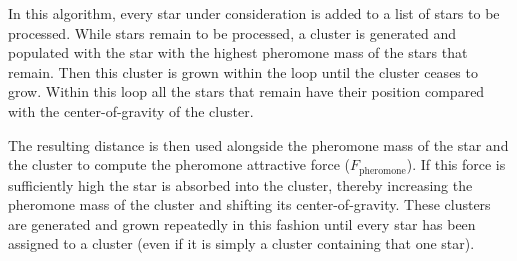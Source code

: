 \vspace{-1.35em}
\indent{}In this algorithm, every star under consideration is added to a list of stars to be processed. While stars remain to be processed, a cluster is generated and populated with the star with the highest pheromone mass of the stars that remain. Then this cluster is grown within the  loop until the cluster ceases to grow. Within this loop all the stars that remain have their position compared with the center-of-gravity of the cluster.

The resulting distance is then used alongside the pheromone mass of the star and the cluster to compute the pheromone attractive force ($F_{\text{pheromone}}$). If this force is sufficiently high the star is absorbed into the cluster, thereby increasing the pheromone mass of the cluster and shifting its center-of-gravity. These clusters are generated and grown repeatedly in this fashion until every star has been assigned to a cluster (even if it is simply a cluster containing that one star).

